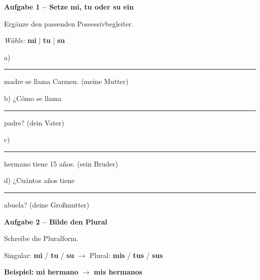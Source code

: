 \documentclass[11pt, a4paper]{article}
\newcommand{\fachfarbe}{spanisch}
\newcommand{\punktebox}[1]{\hfill\fbox{\small \_/#1}}
\newcommand{\luecke}[1]{\rule{#1}{0.4pt}}
\newenvironment{aufgabe}[1]{%
    \needspace{5\baselineskip}%
    \nopagebreak[4]%
    \vspace{10pt}
    \noindent\textbf{\textcolor{\fachfarbe}{Aufgabe #1}}
    \nopagebreak[4]%
    \vspace{5pt}
    \nopagebreak[4]%
    \begin{list}{}{\leftmargin=0pt}
    \item[]
}{%
    \end{list}
}
\newcommand{\es}[1]{\textcolor{\fachfarbe}{\textbf{#1}}}
\begin{document}
\vspace{10pt}


\begin{aufgabe}{1 -- Setze mi, tu oder su ein}
Ergänze den passenden Possessivbegleiter. \punktebox{4}
\end{aufgabe}

\begin{vokabelkasten}
\textit{Wähle:} \es{mi} | \es{tu} | \es{su}
\end{vokabelkasten}

\vspace{0.5em}

\noindent
a) \luecke{2cm} madre se llama Carmen. (meine Mutter)

\vspace{0.8em}

\noindent
b) ¿Cómo se llama \luecke{2cm} padre? (dein Vater)

\vspace{0.8em}

\noindent
c) \luecke{2cm} hermano tiene 15 años. (sein Bruder)

\vspace{0.8em}

\noindent
d) ¿Cuántos años tiene \luecke{2cm} abuela? (deine Großmutter)

\vspace{15pt}


\begin{aufgabe}{2 -- Bilde den Plural}
Schreibe die Pluralform. \punktebox{4}
\end{aufgabe}

\begin{hinweis}
Singular: \es{mi} / \es{tu} / \es{su} $\rightarrow$ Plural: \es{mis} / \es{tus} / \es{sus}
\end{hinweis}

\vspace{0.5em}

\noindent
\textbf{Beispiel:} \es{mi hermano} $\rightarrow$ \es{mis hermanos}

\vspace{1em}
\end{document}
